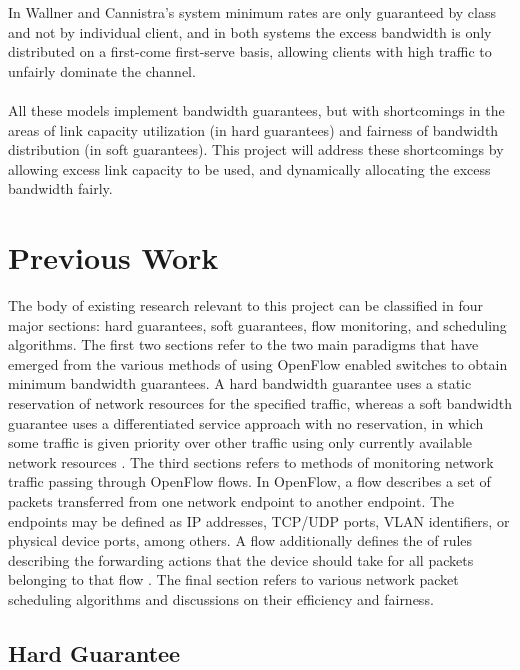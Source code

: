 \documentclass[accepted,single]{gipaper}
\begin{document}
In Wallner and Cannistra's \cite{Wallner:2013} system minimum rates are only guaranteed by class and not by individual client, and in both systems the excess bandwidth is only distributed on a first-come first-serve basis, allowing clients with high traffic to unfairly dominate the channel.
\\\\
All these models implement bandwidth guarantees, but with shortcomings in the areas of link capacity utilization (in hard guarantees) and fairness of bandwidth distribution (in soft guarantees). This project will address these shortcomings by allowing excess link capacity to be used, and dynamically allocating the excess bandwidth fairly.
\fi
\section{Previous Work}
\label{prev_work}

The body of existing research relevant to this project can be classified in four major sections: hard guarantees, soft guarantees, flow monitoring, and scheduling algorithms. The first two sections refer to the two main paradigms that have emerged from the various methods of using OpenFlow enabled switches to obtain minimum bandwidth guarantees. A hard bandwidth guarantee uses a static reservation of network resources for the specified traffic, whereas a soft bandwidth guarantee uses a differentiated service approach with no reservation, in which some traffic is given priority over other traffic using only currently available network resources \cite{softqos}. The third sections refers to methods of monitoring network traffic passing through OpenFlow flows. In OpenFlow, a flow describes a set of packets transferred from one network endpoint to another endpoint. The endpoints may be defined as IP addresses, TCP/UDP ports, VLAN identifiers, or physical device ports, among others. A flow additionally defines the of rules describing the forwarding actions that the device should take for all packets belonging to that flow \cite{flowdef}. The final section refers to various network packet scheduling algorithms and discussions on their efficiency and fairness.

\subsection{Hard Guarantee}
\label{hard_qos}
\end{document}
